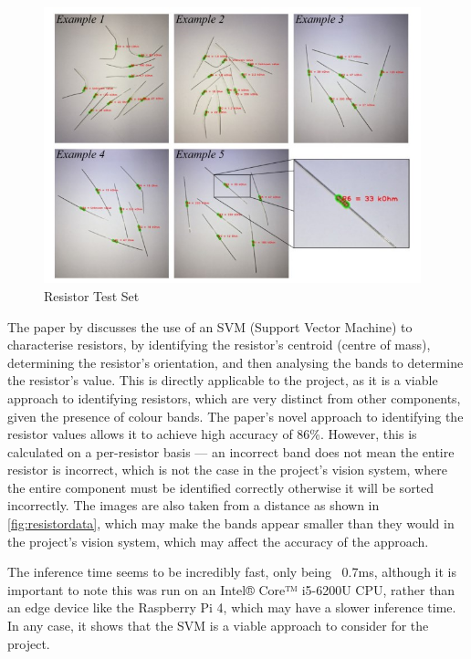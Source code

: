 \begin{figure}[H]
  \hfill
  \begin{minipage}[t]{\textwidth}
    \centering
    \includegraphics[height=8cm]{imgs/articles/resistordata.jpg}
    \caption{Resistor Test Set \cite{8939034}}
    \label{fig:resistordata}
  \end{minipage}
\end{figure}

The paper by \citet{8939034} discusses the use of an SVM (Support Vector Machine) to characterise resistors, by identifying the resistor's centroid (centre of mass), determining the resistor's orientation, and then analysing the bands to determine the resistor's value. This is directly applicable to the project, as it is a viable approach to identifying resistors, which are very distinct from other components, given the presence of colour bands. The paper's novel approach to identifying the resistor values allows it to achieve high accuracy of 86\%. However, this is calculated on a per-resistor basis --- an incorrect band does not mean the entire resistor is incorrect, which is not the case in the project's vision system, where the entire component must be identified correctly otherwise it will be sorted incorrectly. The images are also taken from a distance as shown in \autoref{fig:resistordata}, which may make the bands appear smaller than they would in the project's vision system, which may affect the accuracy of the approach.

The inference time seems to be incredibly fast, only being ~0.7ms, although it is important to note this was run on an Intel® Core™ i5-6200U CPU, rather than an edge device like the Raspberry Pi 4, which may have a slower inference time. In any case, it shows that the SVM is a viable approach to consider for the project.


